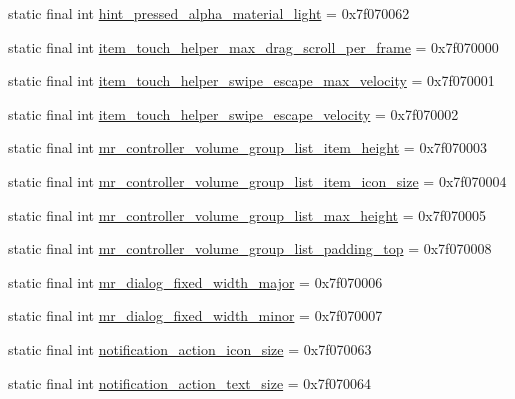 \begin{CompactItemize}
\item 
static final int \hyperlink{classandroid_1_1support_1_1v4_1_1_r_1_1dimen_297bb6adb568bb17bcdb7c4e7fe7ea38}{hint\_\-pressed\_\-alpha\_\-material\_\-light} = 0x7f070062
\item 
static final int \hyperlink{classandroid_1_1support_1_1v4_1_1_r_1_1dimen_4a5fa095b123e7f40615cd55f02fa5a9}{item\_\-touch\_\-helper\_\-max\_\-drag\_\-scroll\_\-per\_\-frame} = 0x7f070000
\item 
static final int \hyperlink{classandroid_1_1support_1_1v4_1_1_r_1_1dimen_5da30c376e3b9c3d161cc2de486beaf3}{item\_\-touch\_\-helper\_\-swipe\_\-escape\_\-max\_\-velocity} = 0x7f070001
\item 
static final int \hyperlink{classandroid_1_1support_1_1v4_1_1_r_1_1dimen_0a4a464e61af09b6e812a8cc45cf69bd}{item\_\-touch\_\-helper\_\-swipe\_\-escape\_\-velocity} = 0x7f070002
\item 
static final int \hyperlink{classandroid_1_1support_1_1v4_1_1_r_1_1dimen_625d2e3dd7dfbc0e7886fb5c28193696}{mr\_\-controller\_\-volume\_\-group\_\-list\_\-item\_\-height} = 0x7f070003
\item 
static final int \hyperlink{classandroid_1_1support_1_1v4_1_1_r_1_1dimen_2381f44f49071bc8cf99e5d16c72ab3a}{mr\_\-controller\_\-volume\_\-group\_\-list\_\-item\_\-icon\_\-size} = 0x7f070004
\item 
static final int \hyperlink{classandroid_1_1support_1_1v4_1_1_r_1_1dimen_81cd0bc64075dc8d0378187f463c82ee}{mr\_\-controller\_\-volume\_\-group\_\-list\_\-max\_\-height} = 0x7f070005
\item 
static final int \hyperlink{classandroid_1_1support_1_1v4_1_1_r_1_1dimen_ba7306fa6e2d12720a4a289495ef9749}{mr\_\-controller\_\-volume\_\-group\_\-list\_\-padding\_\-top} = 0x7f070008
\item 
static final int \hyperlink{classandroid_1_1support_1_1v4_1_1_r_1_1dimen_feb931957e1abc2d1e530c13d31a38fa}{mr\_\-dialog\_\-fixed\_\-width\_\-major} = 0x7f070006
\item 
static final int \hyperlink{classandroid_1_1support_1_1v4_1_1_r_1_1dimen_b530e54469691ab9a8f6384975796754}{mr\_\-dialog\_\-fixed\_\-width\_\-minor} = 0x7f070007
\item 
static final int \hyperlink{classandroid_1_1support_1_1v4_1_1_r_1_1dimen_7c546babd14e95f266222029ea1b53b1}{notification\_\-action\_\-icon\_\-size} = 0x7f070063
\item 
static final int \hyperlink{classandroid_1_1support_1_1v4_1_1_r_1_1dimen_700fdfa5199200df35def00c0edfd7fa}{notification\_\-action\_\-text\_\-size} = 0x7f070064

\end{CompactItemize}
